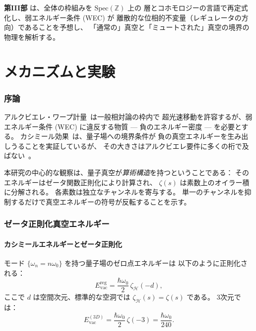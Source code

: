 \documentclass[11pt,a4paper]{article}
\newcommand{\Spec}{\mathrm{Spec}}
\begin{document}
\textbf{第III部} は、全体の枠組みを $\Spec(\mathbb{Z})$ 上の
層とコホモロジーの言語で再定式化し、弱エネルギー条件 (WEC) が
離散的な位相的不変量（レギュレータの方向）であることを予想し、
「通常の」真空と「ミュートされた」真空の境界の物理を解析する。

\newpage
\part{メカニズムと実験}
\label{part:mechanism}

\section{序論}

アルクビエレ・ワープ計量~\cite{Alcubierre1994}は一般相対論の枠内で
超光速移動を許容するが、弱エネルギー条件 (WEC) に違反する物質
--- 負のエネルギー密度 --- を必要とする。
カシミール効果~\cite{Casimir1948}は、量子場への境界条件が
負の真空エネルギーを生み出しうることを実証しているが、
その大きさはアルクビエレ要件に多くの桁で及ばない~\cite{PfenningFord1997}。

本研究の中心的な観察は、量子真空が\emph{算術構造}を持つということである：
そのエネルギーはゼータ関数正則化により計算され、
$\zeta(s)$ は素数上のオイラー積に分解される。
各素数は独立なチャンネルを寄与する。
単一のチャンネルを抑制するだけで真空エネルギーの符号が反転することを示す。

\section{ゼータ正則化真空エネルギー}

\subsection{カシミールエネルギーとゼータ正則化}

モード $\{\omega_n = n\omega_0\}$ を持つ量子場のゼロ点エネルギーは
以下のように正則化される：
\begin{equation}
  E_{\mathrm{vac}}^{\mathrm{reg}} = \frac{\hbar\omega_0}{2}\,\zeta_{\mathcal{H}}(-d),
\end{equation}
ここで $d$ は空間次元、標準的な空洞では $\zeta_{\mathcal{H}}(s) = \zeta(s)$ である。
3次元では：
\begin{equation}
  E_{\mathrm{vac}}^{(3D)} = \frac{\hbar\omega_0}{2}\,\zeta(-3) = \frac{\hbar\omega_0}{240}.
\end{equation}
\end{document}
